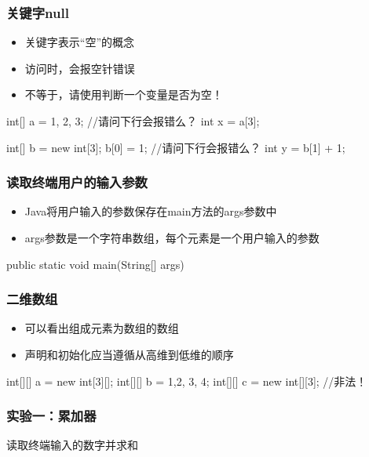 \begin{frame}[fragile]
  \frametitle{关键字null}
  \begin{itemize}
    \item 关键字表示“空”的概念
    \item 访问时，会报空针错误
    \item {}不等于，请使用判断一个变量是否为空！
  \end{itemize}
  \begin{javacode}
    int[] a = {1, 2, 3};
    //请问下行会报错么？
    int x = a[3]; 
    
    int[] b = new int[3];
    b[0] = 1;
    //请问下行会报错么？
    int y = b[1] + 1;
  \end{javacode}
\end{frame}

\begin{frame}[fragile]
  \frametitle{读取终端用户的输入参数}
  \begin{itemize}
    \item Java将用户输入的参数保存在main方法的args参数中
    \item args参数是一个字符串数组，每个元素是一个用户输入的参数
  \end{itemize}
  \begin{javacode}
    public static void main(String[] args) {

    }
  \end{javacode}

\end{frame}

\begin{frame}[fragile]
  \frametitle{二维数组}
  \begin{itemize}
    \item 可以看出组成元素为数组的数组
    \item 声明和初始化应当遵循从高维到低维的顺序
  \end{itemize}
  \begin{javacode}
    int[][] a = new int[3][];
    int[][] b = {{1,2}, {3, 4}};
    int[][] c = new int[][3]; //非法！
  \end{javacode}
\end{frame}

\begin{frame}
  \frametitle{实验一：累加器}
  读取终端输入的数字并求和
\end{frame}










